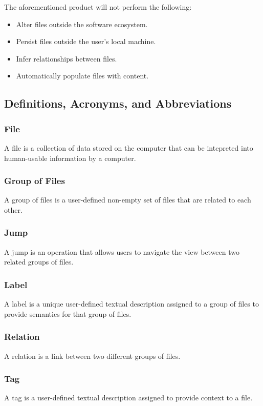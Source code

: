 \documentclass{article}
\begin{document}
The aforementioned product will not perform the following:

\begin{itemize}
    \item Alter files outside the software ecosystem.
    \item Persist files outside the user's local machine.
    \item Infer relationships between files.
    \item Automatically populate files with content.
\end{itemize}

\subsection{Definitions, Acronyms, and Abbreviations}
\subsubsection{File}
A file is a collection of data stored on the computer that can be intepreted into human-usable information by a computer.

\subsubsection{Group of Files}
A group of files is a user-defined non-empty set of files that are related to each other.

\subsubsection{Jump}
A jump is an operation that allows users to navigate the view between two related groups of files.

\subsubsection{Label}
A label is a unique user-defined textual description assigned to a group of files to provide semantics for that group of files.

\subsubsection{Relation}
A relation is a link between two different groups of files.

\subsubsection{Tag}
A tag is a user-defined textual description assigned to provide context to a file.
\end{document}
